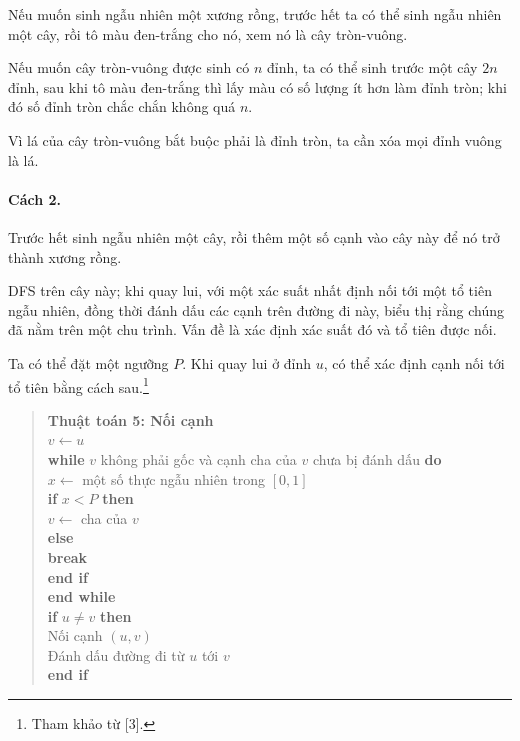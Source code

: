 \documentclass[11pt]{article}
\begin{document}
Nếu muốn sinh ngẫu nhiên một xương rồng, trước hết ta có thể sinh ngẫu nhiên
một cây, rồi tô màu đen-trắng cho nó, xem nó là cây tròn-vuông.

Nếu muốn cây tròn-vuông được sinh có $n$ đỉnh, ta có thể sinh trước một cây
$2n$ đỉnh, sau khi tô màu đen-trắng thì lấy màu có số lượng ít hơn làm đỉnh
tròn; khi đó số đỉnh tròn chắc chắn không quá $n$.

Vì lá của cây tròn-vuông bắt buộc phải là đỉnh tròn, ta cần xóa mọi đỉnh vuông
là lá.

\paragraph{Cách 2.}
Trước hết sinh ngẫu nhiên một cây, rồi thêm một số cạnh vào cây này để nó trở
thành xương rồng.

DFS trên cây này; khi quay lui, với một xác suất nhất định nối tới một tổ tiên
ngẫu nhiên, đồng thời đánh dấu các cạnh trên đường đi này, biểu thị rằng chúng
đã nằm trên một chu trình. Vấn đề là xác định xác suất đó và tổ tiên được nối.

Ta có thể đặt một ngưỡng $P$. Khi quay lui ở đỉnh $u$, có thể xác định cạnh nối
tới tổ tiên bằng cách sau.\footnote{Tham khảo từ [3].}

\begin{quote}
\textbf{Thuật toán 5: Nối cạnh}\\
$v\leftarrow u$\\
\textbf{while} $v$ không phải gốc và cạnh cha của $v$ chưa bị đánh dấu \textbf{do}\\
\hspace*{1.5em}$x\leftarrow$ một số thực ngẫu nhiên trong $[0,1]$\\
\hspace*{1.5em}\textbf{if} $x<P$ \textbf{then}\\
\hspace*{3em}$v\leftarrow$ cha của $v$\\
\hspace*{1.5em}\textbf{else}\\
\hspace*{3em}\textbf{break}\\
\hspace*{1.5em}\textbf{end if}\\
\textbf{end while}\\
\textbf{if} $u\ne v$ \textbf{then}\\
\hspace*{1.5em}Nối cạnh $(u,v)$\\
\hspace*{1.5em}Đánh dấu đường đi từ $u$ tới $v$\\
\textbf{end if}
\end{quote}
\end{document}
